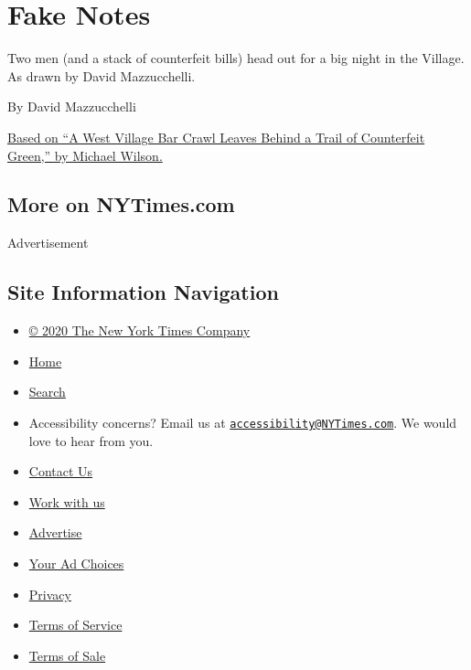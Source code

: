 \hypertarget{fake-notes}{%
\section{Fake Notes}\label{fake-notes}}

Two men (and a stack of counterfeit bills) head out for a big night in
the Village. As drawn by David Mazzucchelli.

By David Mazzucchelli

\href{https://www.nytimes3xbfgragh.onion/2015/03/28/nyregion/a-west-village-bar-crawl-leaves-behind-a-trail-of-counterfeit-green.html}{Based
on ``A West Village Bar Crawl Leaves Behind a Trail of Counterfeit
Green,'' by Michael Wilson.}

\hypertarget{more-on-nytimescom}{%
\subsection{More on NYTimes.com}\label{more-on-nytimescom}}

Advertisement

\hypertarget{site-information-navigation}{%
\subsection{Site Information
Navigation}\label{site-information-navigation}}

\begin{itemize}
\tightlist
\item
  \href{https://help.nytimes3xbfgragh.onion/hc/en-us/articles/115014792127-Copyright-notice}{©
  2020 The New York Times Company}
\item
  \href{https://www.nytimes3xbfgragh.onion}{Home}
\item
  \href{https://www.nytimes3xbfgragh.onion/search/}{Search}
\item
  Accessibility concerns? Email us at
  \href{mailto:accessibility@NYTimes.com}{\nolinkurl{accessibility@NYTimes.com}}.
  We would love to hear from you.
\item
  \href{https://help.nytimes3xbfgragh.onion/hc/en-us/articles/115015385887-Contact-Us}{Contact
  Us}
\item
  \href{https://www.nytco.com/careers/}{Work with us}
\item
  \href{https://nytmediakit.com/}{Advertise}
\item
  \href{https://help.nytimes3xbfgragh.onion/hc/en-us/articles/115014892108-Privacy-policy\#pp}{Your
  Ad Choices}
\item
  \href{https://help.nytimes3xbfgragh.onion/hc/en-us/articles/115014892108-Privacy-policy}{Privacy}
\item
  \href{https://help.nytimes3xbfgragh.onion/hc/en-us/articles/115014893428-Terms-of-service}{Terms
  of Service}
\item
  \href{https://help.nytimes3xbfgragh.onion/hc/en-us/articles/115014893968-Terms-of-sale}{Terms
  of Sale}
\end{itemize}

